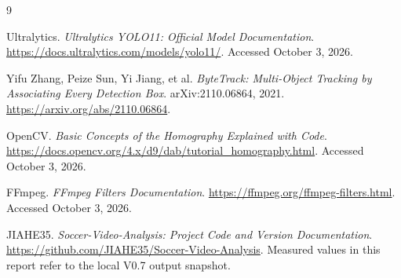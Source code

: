\documentclass[11pt,a4paper]{article}
\begin{document}
\begin{thebibliography}{9}

Ultralytics.
\emph{Ultralytics YOLO11: Official Model Documentation}.
\url{https://docs.ultralytics.com/models/yolo11/}.
Accessed October 3, 2026.

Yifu Zhang, Peize Sun, Yi Jiang, et al.
\emph{ByteTrack: Multi-Object Tracking by Associating Every Detection Box}.
arXiv:2110.06864, 2021.
\url{https://arxiv.org/abs/2110.06864}.

OpenCV.
\emph{Basic Concepts of the Homography Explained with Code}.
\url{https://docs.opencv.org/4.x/d9/dab/tutorial_homography.html}.
Accessed October 3, 2026.

FFmpeg.
\emph{FFmpeg Filters Documentation}.
\url{https://ffmpeg.org/ffmpeg-filters.html}.
Accessed October 3, 2026.

JIAHE35.
\emph{Soccer-Video-Analysis: Project Code and Version Documentation}.
\url{https://github.com/JIAHE35/Soccer-Video-Analysis}.
Measured values in this report refer to the local V0.7 output snapshot.

\end{thebibliography}
\end{document}
